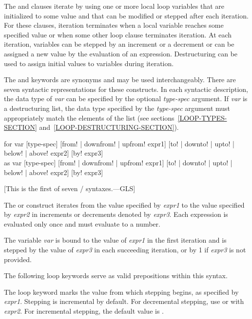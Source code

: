\begin{new}
The  and  clauses iterate by using one or more local 
loop  variables that are initialized to some value and that 
can be modified or stepped after each iteration.  
For these clauses, iteration terminates when a local
variable reaches some specified value or when some other loop clause
terminates iteration.  At each iteration, variables can be stepped by an
increment or a decrement or can be assigned a new value by 
the evaluation of 
an expression.  Destructuring can be used to assign initial values to 
variables during iteration.

The  and  keywords are synonyms and may be used
interchangeably.  There are
seven syntactic representations for these constructs.
In each syntactic description, the data type of
{\it var\/} can be specified by the optional {\it type-spec\/}
argument.  If {\it var\/} is a destructuring list, the data type
specified by the {\it type-spec\/} argument must appropriately match
the elements of the list (see sections~\ref{LOOP-TYPES-SECTION}
and~\ref{LOOP-DESTRUCTURING-SECTION}).

\begin{defloop}
for var [type-spec] [{\!from! | \!downfrom! | \!upfrom!} expr1]
                    [{\!to! | \!downto! | \!upto! | \!below! | \!above!} expr2]
                    [\!by! expr3] \\
as var [type-spec] [{\!from! | \!downfrom! | \!upfrom!} expr1]
                   [{\!to! | \!downto! | \!upto! | \!below! | \!above!} expr2]
                   [\!by! expr3]

[This is the first of seven / syntaxes.---GLS]

The  or  construct iterates from the value specified by
{\it expr1\/} to the value specified by {\it expr2\/} in increments or
decrements denoted by {\it expr3}. Each
expression is evaluated only once and must evaluate to a number.  

The variable {\it var\/} is bound to the value of 
{\it expr1\/} in the first iteration and is stepped
by the value of {\it expr3\/} in each succeeding iteration,
or by 1 if {\it expr3\/} is not provided.  

The following loop keywords serve as valid prepositions within this 
syntax.

\begin{flushdesc}
\item[\cdf{from}]
The loop keyword  marks the value from which
stepping begins, as specified by {\it expr1}.  
Stepping is incremental by default.  For
decremental stepping, use 
or  with {\it expr2}.  For incremental
stepping, the default  value is .


\end{flushdesc}
\end{defloop}
\end{new}

